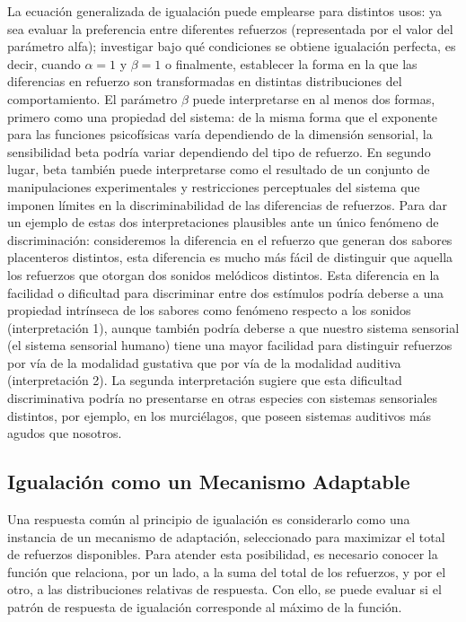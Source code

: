 \documentclass[
  letterpaper,
]{book}
\begin{document}
La ecuación generalizada de igualación puede emplearse para distintos
usos: ya sea evaluar la preferencia entre diferentes refuerzos
(representada por el valor del parámetro alfa); investigar bajo qué
condiciones se obtiene igualación perfecta, es decir, cuando
\(\alpha = 1\) y \(\beta = 1\) o finalmente, establecer la forma en la
que las diferencias en refuerzo son transformadas en distintas
distribuciones del comportamiento. El parámetro \(\beta\) puede
interpretarse en al menos dos formas, primero como una propiedad del
sistema: de la misma forma que el exponente para las funciones
psicofísicas varía dependiendo de la dimensión sensorial, la
sensibilidad beta podría variar dependiendo del tipo de refuerzo. En
segundo lugar, beta también puede interpretarse como el resultado de un
conjunto de manipulaciones experimentales y restricciones perceptuales
del sistema que imponen límites en la discriminabilidad de las
diferencias de refuerzos. Para dar un ejemplo de estas dos
interpretaciones plausibles ante un único fenómeno de discriminación:
consideremos la diferencia en el refuerzo que generan dos sabores
placenteros distintos, esta diferencia es mucho más fácil de distinguir
que aquella los refuerzos que otorgan dos sonidos melódicos distintos.
Esta diferencia en la facilidad o dificultad para discriminar entre dos
estímulos podría deberse a una propiedad intrínseca de los sabores como
fenómeno respecto a los sonidos (interpretación 1), aunque también
podría deberse a que nuestro sistema sensorial (el sistema sensorial
humano) tiene una mayor facilidad para distinguir refuerzos por vía de
la modalidad gustativa que por vía de la modalidad auditiva
(interpretación 2). La segunda interpretación sugiere que esta
dificultad discriminativa podría no presentarse en otras especies con
sistemas sensoriales distintos, por ejemplo, en los murciélagos, que
poseen sistemas auditivos más agudos que nosotros.

\subsection{Igualación como un Mecanismo
Adaptable}\label{igualaciuxf3n-como-un-mecanismo-adaptable}

Una respuesta común al principio de igualación es considerarlo como una
instancia de un mecanismo de adaptación, seleccionado para maximizar el
total de refuerzos disponibles. Para atender esta posibilidad, es
necesario conocer la función que relaciona, por un lado, a la suma del
total de los refuerzos, y por el otro, a las distribuciones relativas de
respuesta. Con ello, se puede evaluar si el patrón de respuesta de
igualación corresponde al máximo de la función.
\end{document}
